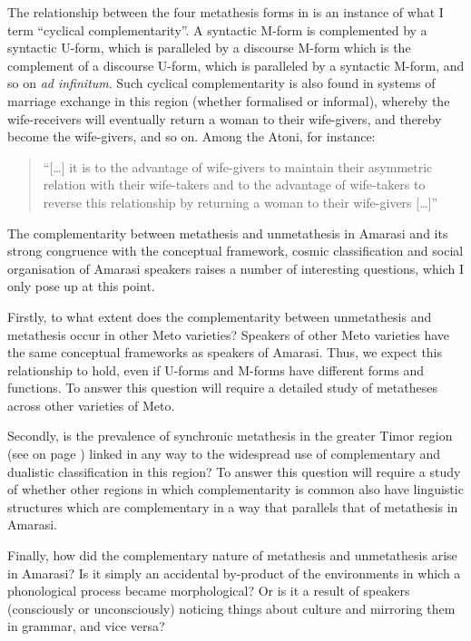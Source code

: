 The relationship between the four metathesis forms in  is
an instance of what I term ``cyclical complementarity''.
A syntactic M-form is complemented by a syntactic U-form,
which is paralleled by a discourse M-form which is the complement
of a discourse U-form, which is paralleled by a syntactic M-form,
and so on \emph{ad infinitum}.
Such cyclical complementarity is also found in
systems of marriage exchange in this region (whether formalised or informal),
whereby the wife-receivers will eventually return a woman to their wife-givers,
and thereby become the wife-givers, and so on.
Among the Atoni, for instance:

\begin{quote}
``[\ldots] it is to the advantage of wife-givers to maintain their
asymmetric relation with their wife-takers and to the advantage of wife-takers
to reverse this relationship by returning a woman to their wife-givers [\ldots]''
\cite{fo99}
\end{quote}

The complementarity between metathesis and unmetathesis in Amarasi
and its strong congruence with the conceptual framework,
cosmic classification and social organisation of Amarasi speakers
raises a number of interesting questions,
which I only pose up at this point.

Firstly, to what extent does the complementarity between unmetathesis and
metathesis occur in other Meto varieties?
Speakers of other Meto varieties have the same conceptual frameworks
as speakers of Amarasi. Thus, we expect this relationship to hold,
even if U-forms and M-forms have different forms and functions.
To answer this question will require a detailed study of
metatheses across other varieties of Meto.

Secondly, is the prevalence of synchronic metathesis in the greater Timor region
(see  on page \pageref{fig:CVMetTimReg}) linked in any way
to the widespread use of complementary and dualistic classification in this region?
To answer this question will require a study of whether other regions
in which complementarity is common also have linguistic structures
which are complementary in a way that parallels that of metathesis in Amarasi.

Finally, how did the complementary nature of metathesis and unmetathesis arise in Amarasi?
Is it simply an accidental by-product of the environments
in which a phonological process became morphological?
Or is it a result of speakers (consciously or unconsciously)
noticing things about culture and mirroring them in grammar, and vice versa?

